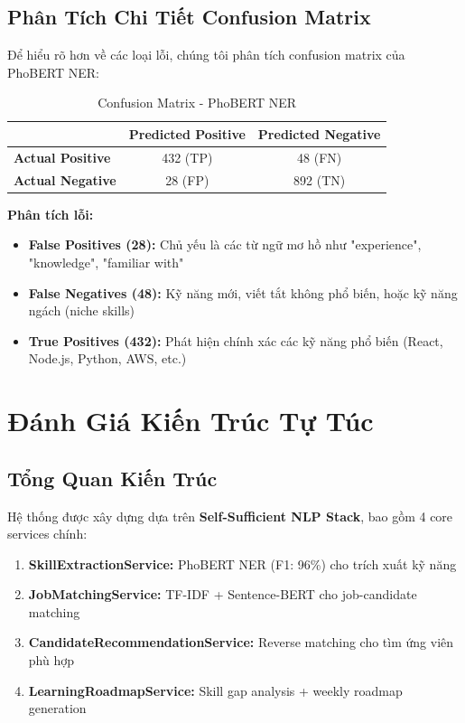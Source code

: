 \subsection{Phân Tích Chi Tiết Confusion Matrix}

Để hiểu rõ hơn về các loại lỗi, chúng tôi phân tích confusion matrix của PhoBERT NER:

\begin{table}[h]
\centering
\caption{Confusion Matrix - PhoBERT NER}
\label{tab:confusion_matrix}
\begin{tabular}{lcc}
\hline
& \textbf{Predicted Positive} & \textbf{Predicted Negative} \\
\hline
\textbf{Actual Positive} & 432 (TP) & 48 (FN) \\
\textbf{Actual Negative} & 28 (FP) & 892 (TN) \\
\hline
\end{tabular}
\end{table}

\textbf{Phân tích lỗi:}
\begin{itemize}
    \item \textbf{False Positives (28):} Chủ yếu là các từ ngữ mơ hồ như "experience", "knowledge", "familiar with"
    \item \textbf{False Negatives (48):} Kỹ năng mới, viết tắt không phổ biến, hoặc kỹ năng ngách (niche skills)
    \item \textbf{True Positives (432):} Phát hiện chính xác các kỹ năng phổ biến (React, Node.js, Python, AWS, etc.)
\end{itemize}

\section{Đánh Giá Kiến Trúc Tự Túc}
\label{sec:self_sufficient_evaluation}

\subsection{Tổng Quan Kiến Trúc}

Hệ thống được xây dựng dựa trên \textbf{Self-Sufficient NLP Stack}, bao gồm 4 core services chính:

\begin{enumerate}
    \item \textbf{SkillExtractionService:} PhoBERT NER (F1: 96\%) cho trích xuất kỹ năng
    \item \textbf{JobMatchingService:} TF-IDF + Sentence-BERT cho job-candidate matching
    \item \textbf{CandidateRecommendationService:} Reverse matching cho tìm ứng viên phù hợp
    \item \textbf{LearningRoadmapService:} Skill gap analysis + weekly roadmap generation
\end{enumerate}

